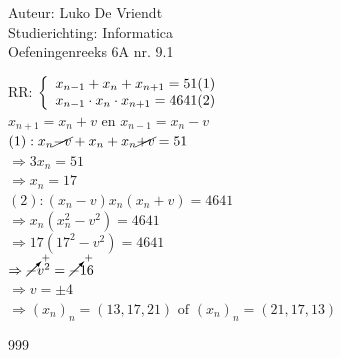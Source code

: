 \documentclass[a4paper]{article}
\begin{document}
\noindent \large Auteur: Luko De Vriendt\\
\noindent \large Studierichting: Informatica\\
\noindent \large Oefeningenreeks 6A nr. 9.1\\

\medskip

\normalsize

RR:
$\left \{
\begin{array}{l}
     x_{n-1} + x_n + x_{n+1} = 51 \space(1) \\
     x_{n-1} \cdot x_n \cdot x_{n+1} = 4641 \space(2)
\end{array}
\right .$ \\

$x_{n+1} = x_n + v \text{ en } x_{n-1} = x_n - v$ \\

$(1): x_n \cancel{-v} + x_n + x_n \cancel{+v} = 51$ \\

$\Rightarrow 3x_n = 51$ \\

$\Rightarrow x_n = 17$ \\

$(2): (x_n-v)x_n(x_n+v) = 4641$ \\

$\Rightarrow x_n\left(x_n^2-v^2\right) = 4641$ \\

$\Rightarrow 17\left(17^2 - v^2\right) = 4641$ \\

$\Rightarrow \cancelto{+}{-}v^2 = \cancelto{+}{-}16$ \\

$\Rightarrow v = \pm 4$ \\

$\Rightarrow (x_n)_n = (13, 17, 21) \text{ of } (x_n)_n = (21, 17, 13)$ \\

\begin{thebibliography}{999}
\end{thebibliography}
\end{document}

